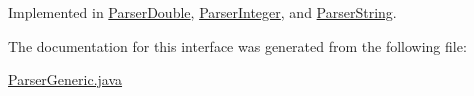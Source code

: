 Implemented in \hyperlink{classParserDouble_a45d2180f6c110f27347c95c2d207b462}{Parser\+Double}, \hyperlink{classParserInteger_a56a141fdc62fbc8589b4259a0e65cbaa}{Parser\+Integer}, and \hyperlink{classParserString_a7054c77bf5579a99a7abf166aad1c640}{Parser\+String}.



The documentation for this interface was generated from the following file\+:\begin{DoxyCompactItemize}
\item 
\hyperlink{ParserGeneric_8java}{Parser\+Generic.\+java}\end{DoxyCompactItemize}
